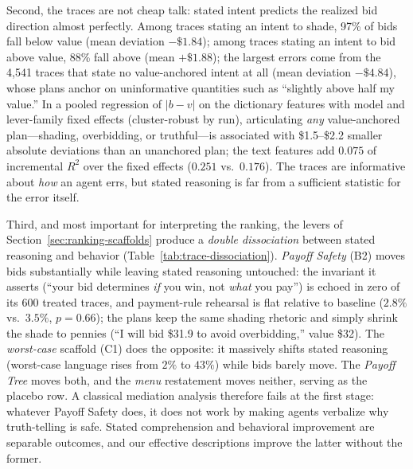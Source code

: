 Second, the traces are not cheap talk: stated intent predicts the realized
bid direction almost perfectly. Among traces stating an intent to shade,
97\% of bids fall below value (mean deviation $-\$1.84$); among traces
stating an intent to bid above value, 88\% fall above (mean $+\$1.88$); the
largest errors come from the 4{,}541 traces that state no value-anchored
intent at all (mean deviation $-\$4.84$), whose plans anchor on
uninformative quantities such as ``slightly above half my value.'' In a
pooled regression of $|b-v|$ on the dictionary features with model and
lever-family fixed effects (cluster-robust by run), articulating \emph{any}
value-anchored plan---shading, overbidding, or truthful---is associated with
\$1.5--\$2.2 smaller absolute deviations than an unanchored plan; the text
features add $0.075$ of incremental $R^2$ over the fixed effects
($0.251$ vs.\ $0.176$). The traces are informative about \emph{how} an
agent errs, but stated reasoning is far from a sufficient statistic for the
error itself.

Third, and most important for interpreting the ranking, the levers of
Section~\ref{sec:ranking-scaffolds} produce a \emph{double dissociation}
between stated reasoning and behavior
(Table~\ref{tab:trace-dissociation}). \emph{Payoff Safety} (B2) moves bids
substantially while leaving stated reasoning untouched: the invariant it
asserts (``your bid determines \emph{if} you win, not \emph{what} you
pay'') is echoed in zero of its 600 treated traces, and payment-rule
rehearsal is flat relative to baseline ($2.8\%$ vs.\ $3.5\%$, $p=0.66$);
the plans keep the same shading rhetoric and simply shrink the shade to
pennies (``I will bid \$31.9 to avoid overbidding,'' value \$32). The
\emph{worst-case} scaffold (C1) does the opposite: it massively shifts
stated reasoning (worst-case language rises from $2\%$ to $43\%$) while
bids barely move. The \emph{Payoff Tree} moves both, and the \emph{menu}
restatement moves neither, serving as the placebo row. A classical
mediation analysis therefore fails at the first stage: whatever Payoff
Safety does, it does not work by making agents verbalize why truth-telling
is safe. Stated comprehension and behavioral improvement are separable
outcomes, and our effective descriptions improve the latter without the
former.

